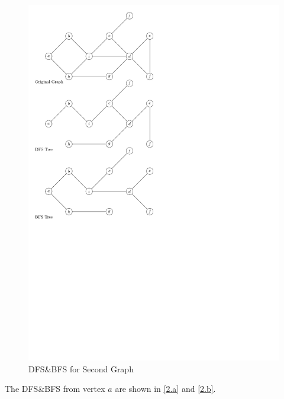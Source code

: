 \begin{homeworkProblem}
\begin{homeworkSubProblem}
    \begin{figure}[H]
        \caption{DFS\&BFS for Second Graph}\label{1.b}
        \centering
        \includegraphics[width=.65\textwidth]{running1b}
    \end{figure}
\end{homeworkSubProblem}

\pagebreak
\begin{homeworkSubProblem}
    The DFS\&BFS from vertex $a$ are shown in \cref{2.a} and \cref{2.b}.


\end{homeworkSubProblem}
\end{homeworkProblem}
